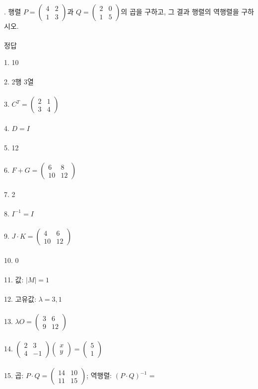 \documentclass[fleqn]{article}
\begin{document}
. 행렬 \( P = \begin{pmatrix} 4 & 2 \\ 1 & 3 \end{pmatrix} \)과 \( Q = \begin{pmatrix} 2 & 0 \\ 1 & 5 \end{pmatrix} \)의 곱을 구하고, 그 결과 행렬의 역행렬을 구하시오. \\\\

 정답

1. 10 \\\\
2. 2행 3열 \\\\
3. \( C^T = \begin{pmatrix} 2 & 1 \\ 3 & 4 \end{pmatrix} \) \\\\
4. \( D = I \) \\\\
5. 12 \\\\
6. \( F + G = \begin{pmatrix} 6 & 8 \\ 10 & 12 \end{pmatrix} \) \\\\
7. 2 \\\\
8. \( I^{-1} = I \) \\\\
9. \( J \cdot K = \begin{pmatrix} 4 & 6 \\ 10 & 12 \end{pmatrix} \) \\\\
10. 0 \\\\
11. 값: \( |M| = 1 \) \\\\
12. 고유값: \( \lambda = 3, 1 \) \\\\
13. \( \lambda O = \begin{pmatrix} 3 & 6 \\ 9 & 12 \end{pmatrix} \) \\\\
14. \( \begin{pmatrix} 2 & 3 \\ 4 & -1 \end{pmatrix} \begin{pmatrix} x \\ y \end{pmatrix} = \begin{pmatrix} 5 \\ 1 \end{pmatrix} \) \\\\
15. 곱: \( P \cdot Q = \begin{pmatrix} 14 & 10 \\ 11 & 15 \end{pmatrix} \); 역행렬: \( (P \cdot Q)^{-1} \) =  \\\\
      
        
\end{document}
